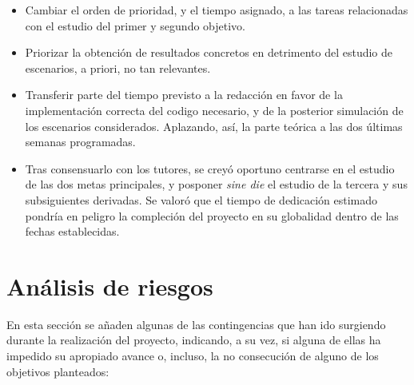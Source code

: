 \documentclass[IB,BIB]{TFUOC}%
\begin{document}
\begin{itemize}
    \item Cambiar el orden de prioridad, y el tiempo asignado, a las tareas relacionadas con el estudio del primer y segundo objetivo.
    \item Priorizar la obtención de resultados concretos en detrimento del estudio de escenarios, a priori, no tan relevantes.
    \item Transferir parte del tiempo previsto a la redacción en favor de la implementación correcta del codigo necesario, y de la posterior simulación de los escenarios considerados. Aplazando, así, la parte teórica a las dos últimas semanas programadas.
    \item Tras consensuarlo con los tutores, se creyó oportuno centrarse en el estudio de las dos metas principales, y posponer \textit{sine die} el estudio de la tercera y sus subsiguientes derivadas. Se valoró que el tiempo de dedicación estimado pondría en peligro la compleción del proyecto en su globalidad dentro de las fechas establecidas.
\end{itemize}

\normalsize


\section{Análisis de riesgos}
\label{sec:Análisis de riesgos}

En esta sección se añaden algunas de las contingencias que han ido surgiendo durante la realización del proyecto, indicando, a su vez, si alguna de ellas ha impedido su apropiado avance o, incluso, la no consecución de alguno de los objetivos planteados:

\footnotesize
\end{document}
